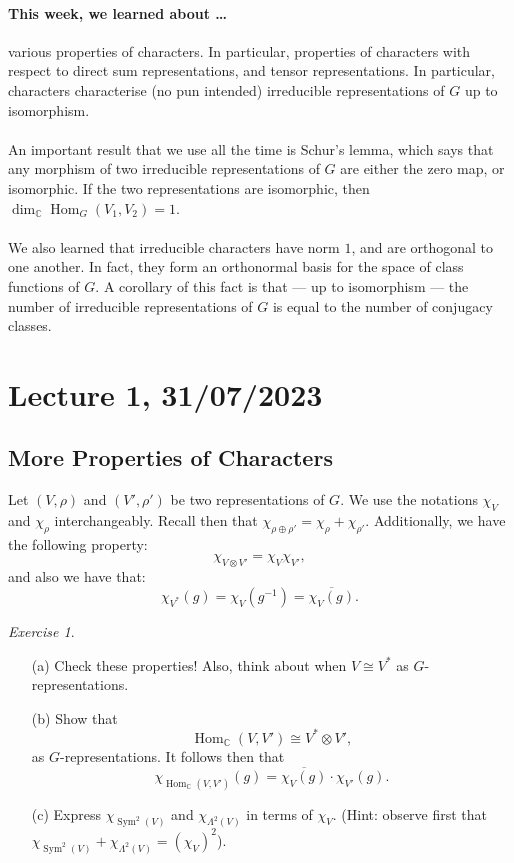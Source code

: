 \documentclass[a4paper]{report}
\theoremstyle{definition}
\theoremstyle{remark}
\theoremstyle{proposition}
\theoremstyle{conjecture}
\theoremstyle{lemma}
\theoremstyle{corollary}
\theoremstyle{exercise}
\newtheorem{exercise}{Exercise}
\theoremstyle{example}
\newcommand{\C}{\mathbb{C}}
\newcommand{\on}{\operatorname}
\begin{document}
\paragraph{This week, we learned about \ldots} various properties of characters. 
In particular, properties of characters with respect to direct sum representations, and 
tensor representations. In particular, characters characterise (no pun intended) irreducible 
representations of $G$ up to isomorphism.\\\\
An important result that we use all the time is Schur's lemma, which says that
any morphism of two irreducible representations of $G$ are either the zero map,
or isomorphic. If the two representations are isomorphic, then
$\dim_\C\on{Hom}_G(V_1,V_2) = 1$.\\\\
We also learned that irreducible characters have norm $1$, and 
are orthogonal to one another. In fact, they form an orthonormal basis for the space 
of class functions of $G$. A corollary of this fact is that --- up to isomorphism --- the number 
of irreducible representations of $G$ is equal to the number of conjugacy classes.

\section{Lecture 1, 31/07/2023}

\subsection{More Properties of Characters}

Let $(V,\rho)$ and $(V',\rho')$ be two representations of $G$. We use the 
notations $\chi_V$ and $\chi_\rho$ interchangeably. 
Recall then that $\chi_{\rho\oplus \rho'} = \chi_\rho + \chi_{\rho'}$.
Additionally, we have the following property:
$$\chi_{V\otimes V'} = \chi_V \chi_{V'},$$
and also we have that: 
$$\chi_{V^\ast}(g) = \chi_V(g^{-1}) = \overline{\chi_V(g)}.$$
\begin{exercise}
    \leavevmode
    \begin{itemize}
        \item[(a)] Check these properties! Also, think about when 
            $V \cong V^\ast$ as $G$-representations.
        \item[(b)] Show that 
            $$\on{Hom}_\C(V,V') \cong V^\ast \otimes V',$$
            as $G$-representations.
            It follows then that $$\chi_{\on{Hom}_\C(V,V')}(g) = \overline{\chi_V(g)} \cdot \chi_{V'}(g).$$
        \item[(c)] Express $\chi_{\on{Sym}^2(V)}$ and $\chi_{\Lambda^2(V)}$ 
            in terms of $\chi_V$. (Hint: observe first that 
            $\chi_{\on{Sym}^2(V)} + \chi_{\Lambda^2(V)} = (\chi_V)^2$).
    \end{itemize}
\end{exercise}
\end{document}
